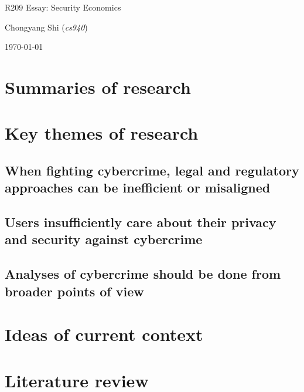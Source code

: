 \documentclass[11pt]{article}
\begin{document}
\centerline{\Large R209 Essay:  Security Economics}
\vspace{2em}
\centerline{\large Chongyang Shi (\emph{cs940})}
\vspace{1em}
\centerline{\large \today}
\vspace{1em}

\section{Summaries of research}

\section{Key themes of research}

\subsection{When fighting cybercrime, legal and regulatory approaches can be inefficient or misaligned}

\subsection{Users insufficiently care about their privacy and security against cybercrime}

\subsection{Analyses of cybercrime should be done from broader points of view}

\section{Ideas of current context}

\section{Literature review}



\footnotesize{}
\end{document}
